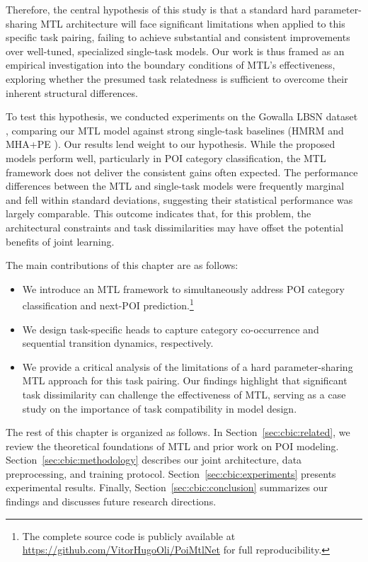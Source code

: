 Therefore, the central hypothesis of this study is that a standard hard parameter-sharing MTL architecture will face significant limitations when applied to this specific task pairing, failing to achieve substantial and consistent improvements over well-tuned, specialized single-task models. Our work is thus framed as an empirical investigation into the boundary conditions of MTL's effectiveness, exploring whether the presumed task relatedness is sufficient to overcome their inherent structural differences.

To test this hypothesis, we conducted experiments on the Gowalla LBSN dataset \cite{cho2011gowalla,jure2014snap}, comparing our MTL model against strong single-task baselines (HMRM \cite{chen2020modeling} and MHA+PE \cite{zeng2019next}). Our results lend weight to our hypothesis. While the proposed models perform well, particularly in POI category classification, the MTL framework does not deliver the consistent gains often expected. The performance differences between the MTL and single-task models were frequently marginal and fell within standard deviations, suggesting their statistical performance was largely comparable. This outcome indicates that, for this problem, the architectural constraints and task dissimilarities may have offset the potential benefits of joint learning.

The main contributions of this chapter are as follows:
\begin{itemize}
    \item We introduce an MTL framework to simultaneously address POI category classification and next-POI prediction.\footnote{The complete source code is publicly available at \url{https://github.com/VitorHugoOli/PoiMtlNet} for full reproducibility.}
    \item We design task-specific heads to capture category co-occurrence and sequential transition dynamics, respectively.
    \item We provide a critical analysis of the limitations of a hard parameter-sharing MTL approach for this task pairing. Our findings highlight that significant task dissimilarity can challenge the effectiveness of MTL, serving as a case study on the importance of task compatibility in model design.
\end{itemize}

The rest of this chapter is organized as follows. In Section~\ref{sec:cbic:related}, we review the theoretical foundations of MTL and prior work on POI modeling. Section~\ref{sec:cbic:methodology} describes our joint architecture, data preprocessing, and training protocol. Section~\ref{sec:cbic:experiments} presents experimental results. Finally, Section~\ref{sec:cbic:conclusion} summarizes our findings and discusses future research directions.
